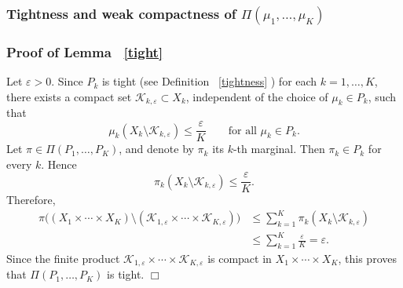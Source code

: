 \documentclass[twoside,11pt,a4paper]{article}
\newcommand*{\SavedRef}{}
\let\SavedRef\ref
\renewcommand*{\ref}[1]{  \begingroup
    \hypersetup{
      linkcolor=linkequation,
      linkbordercolor=linkequation,
    }    \SavedRef{#1}  \endgroup
}
\begin{document}
\subsubsection{Tightness and weak compactness of \texorpdfstring{$\Pi(\mu_1,\ldots,\mu_K)$}{}}\label{tightcompact}

\subsubsection*{Proof of Lemma~\ref{tight}}
Let \(\varepsilon>0\). Since \(P_k\) is tight (see Definition~\ref{tightness}) for each
\(k=1,\ldots,K\), there exists a compact set
\(\mathcal K_{k,\varepsilon}\subset X_k\), independent of the choice of
\(\mu_k\in P_k\), such that
\[
\mu_k(X_k\setminus \mathcal K_{k,\varepsilon})
\le \frac{\varepsilon}{K}
\qquad
\text{for all } \mu_k\in P_k .
\]
Let \(\pi\in \Pi(P_1,\ldots,P_K)\), and denote by \(\pi_k\) its \(k\)-th
marginal. Then \(\pi_k\in P_k\) for every \(k\). Hence
\[
\pi_k(X_k\setminus \mathcal K_{k,\varepsilon})
\le \frac{\varepsilon}{K}.
\]
Therefore,
\[
\begin{aligned}
\pi\Big(
(X_1\times\cdots\times X_K)
\setminus
(\mathcal K_{1,\varepsilon}\times\cdots\times \mathcal K_{K,\varepsilon})
\Big)
&\le
\sum_{k=1}^K
\pi_k(X_k\setminus \mathcal K_{k,\varepsilon})  \\
&\le
\sum_{k=1}^K \frac{\varepsilon}{K}
=
\varepsilon .
\end{aligned}
\]
Since the finite product $
\mathcal K_{1,\varepsilon}\times\cdots\times \mathcal K_{K,\varepsilon}$
is compact in \(X_1\times\cdots\times X_K\), this proves that
\(\Pi(P_1,\ldots,P_K)\) is tight.
\hfill\(\Box\)
   
\end{document}
